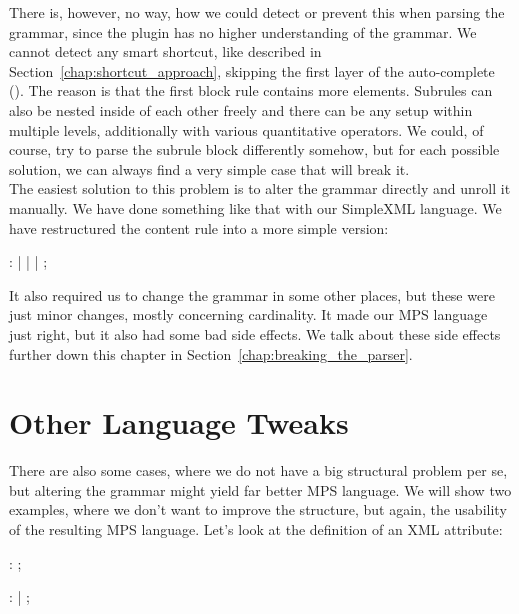 There is, however, no way, how we could detect or prevent this when parsing the grammar, since the plugin has no higher understanding of the grammar.
We cannot detect any smart shortcut, like described in Section~\ref{chap:shortcut_approach}, skipping the first layer of the auto-complete ().
The reason is that the first block rule contains more elements.
Subrules can also be nested inside of each other freely and there can be any setup within multiple levels, additionally with various quantitative operators.
We could, of course, try to parse the subrule block differently somehow, but for each possible solution, we can always find a very simple case that will break it.
\\

The easiest solution to this problem is to alter the grammar directly and unroll it manually.
We have done something like that with our SimpleXML language.
We have restructured the content rule into a more simple version:

\begin{antlr}
	    :   
	           |   
	           |   
	           |   
	           ;
\end{antlr}

It also required us to change the grammar in some other places, but these were just minor changes, mostly concerning cardinality.
It made our MPS language just right, but it also had some bad side effects.
We talk about these side effects further down this chapter in Section~\ref{chap:breaking_the_parser}.

\section{Other Language Tweaks}

There are also some cases, where we do not have a big structural problem per se, but altering the grammar might yield far better MPS language.
We will show two examples, where we don't want to improve the structure, but again, the usability of the resulting MPS language.
Let's look at the definition of an XML attribute:

\begin{antlr}
	   :    \literal{=}  ;

	      :    \regex{~["]*} 
	            |    \regex{~[']*} 
	            ;
\end{antlr}

